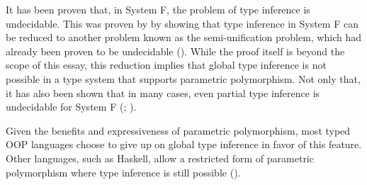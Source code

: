It has been proven that, in System F, the problem of type inference is undecidable. This was proven by \cite{wells} by showing that type inference in System F can be reduced to another problem known as the semi-unification problem, which had already been proven to be undecidable (\cite{kfoury}). While the proof itself is beyond the scope of this essay, this reduction implies that global type inference is not possible in a type system that supports parametric polymorphism. Not only that, it has also been shown that in many cases, even partial type inference is undecidable for System F (\cite{boehm1985}; \cite{boehm1989}).

Given the benefits and expressiveness of parametric polymorphism, most typed OOP languages choose to give up on global type inference in favor of this feature. Other languages, such as Haskell, allow a restricted form of parametric polymorphism where type inference is still possible (\cite{pierce}).
